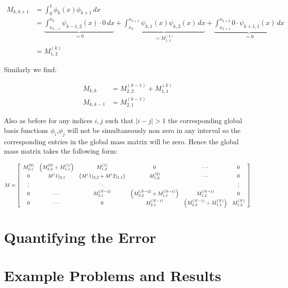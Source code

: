 \begin{align*}
	M_{k,k+1} &= \int_0^1\phi_k(x)\phi_{k+1}\, dx \\
              &= \underbrace{\int_{x_{k-1}}^{x_k}\psi_{k-1,2}(x) \cdot 0\, dx}_{ = 0}
               + \underbrace{\int_{x_k}^{x_{k+1}}\psi_{k,1}(x)\psi_{k,2}(x)\, dx}_{= M^{(k)}_{1,2}}
               + \underbrace{\int_{x_{k+1}}^{x_{k+2}}0 \cdot \psi_{k+1,1}(x)\, dx}_{= 0} \\
              &= M^{(k)}_{1,2}
\end{align*}

Similarly we find:

\begin{align*}
	M_{k,k} &= M^{(k-1)}_{2,2} + M^{(k)}_{1,1} \\
    M_{k,k-1} &= M^{(k-1)}_{2,1}
\end{align*}

Also as before for any indices $i,j$ such that $|i - j| > 1$ the corresponding global basis functions $\phi_i$,$\phi_j$
will not be simultaneously non zero in any interval so the corresponding entries in the global mass matrix will be zero. Hence
the global mass matrix takes the following form:

\begin{equation}\label{eq:oned-deterministic-global-mass}
	M = \left[\begin{array}{c c c c c c}
    		M^{(0)}_{2,1} & \left(M^{(0)}_{2,2} + M^{(1)}_{1,1}\right) & M^{(1)}_{1,2} & 0 & \cdots & 0 \\
            0 & M^(1)_{2,1} & \left(M^(1)_{2,2} + M^(2)_{1,1}\right) & M^{(2)}_{1,2} & \cdots & 0 \\
            \vdots & & \ddots & & & \vdots \\
            0 & \cdots & M^{(N-2)}_{2,1} & \left(M^{(N-2)}_{2,2} + M^{(N-1)}_{1,1}\right) & M^{(N-1)}_{1,2} & 0  \\
            0 &\cdots & 0 & M^{(N-1)}_{2,1} & \left(M^{(N-1)}_{2,2} + M^{(N)}_{1,1}\right) & M^{(N)}_{1,2}
        \end{array}\right]
\end{equation}

\section{Quantifying the Error}


\section{Example Problems and Results}

